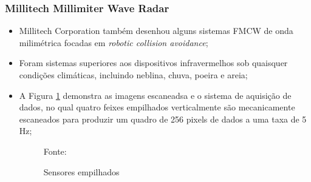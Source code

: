 \documentclass[xcolor=dvipsnames, aspectratio=169]{beamer}
\begin{document}
\begin{frame}
\frametitle{Millitech Millimiter Wave Radar}
	\begin{itemize}
		\item Millitech Corporation também desenhou alguns sistemas FMCW de onda milimétrica focadas em \textit{robotic collision avoidance};
		\item Foram sistemas superiores aos dispositivos infravermelhos sob quaisquer condições climáticas, incluindo neblina, chuva, poeira e areia;
        \item A Figura \ref{fig:militech} demonstra as imagens escaneadsa e o sistema de aquisição de dados, no qual quatro feixes empilhados verticalmente são mecanicamente escaneados para produzir um quadro de 256 pixels de dados a uma taxa de 5 Hz;
        \begin{figure}
            \centering
            {Fonte: \cite{everett1995sensors}}
            \caption{Sensores empilhados}
            \label{fig:militech}
        \end{figure}
        

\end{itemize}
\end{frame}
\end{document}
